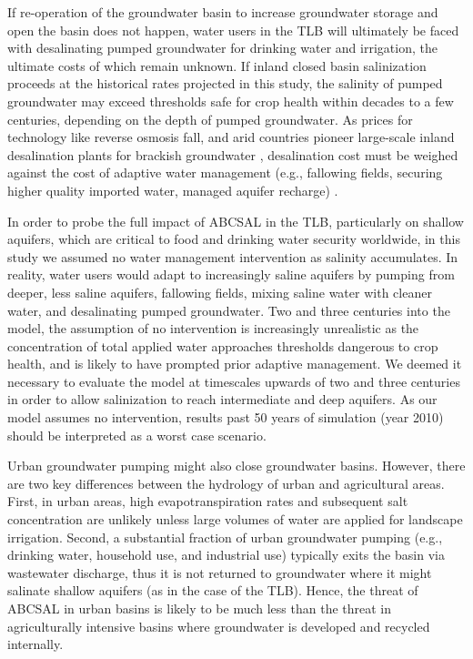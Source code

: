 If re-operation of the groundwater basin to increase groundwater storage and open the basin does not happen, water users in the TLB will ultimately be faced with desalinating pumped groundwater for drinking water and irrigation, the ultimate costs of which remain unknown. If inland closed basin salinization proceeds at the historical rates projected in this study, the salinity of pumped groundwater may exceed thresholds safe for crop health within decades to a few centuries, depending on the depth of pumped groundwater. As prices for technology like reverse osmosis fall, and arid countries pioneer large-scale inland desalination plants for brackish groundwater \citep{Nativ2004, Tal2006}, desalination cost must be weighed against the cost of adaptive water management (e.g., fallowing fields, securing higher quality imported water, managed aquifer recharge) \citep{Hanak2019}. %

In order to probe the full impact of ABCSAL in the TLB, particularly on shallow aquifers, which are critical to food and drinking water security worldwide, in this study we assumed no water management intervention as salinity accumulates. In reality, water users would adapt to increasingly saline aquifers by pumping from deeper, less saline aquifers, fallowing fields, mixing saline water with cleaner water, and desalinating pumped groundwater. Two and three centuries into the model, the assumption of no intervention is increasingly unrealistic as the concentration of total applied water approaches thresholds dangerous to crop health, and is likely to have prompted prior adaptive management. We deemed it necessary to evaluate the model at timescales upwards of two and three centuries in order to allow salinization to reach intermediate and deep aquifers. As our model assumes no intervention, results past 50 years of simulation (year 2010) should be interpreted as a worst case scenario.

Urban groundwater pumping might also close groundwater basins. However, there are two key differences between the hydrology of urban and agricultural areas. First, in urban areas, high evapotranspiration rates and subsequent salt concentration are unlikely unless large volumes of water are applied for landscape irrigation. Second, a substantial fraction of urban groundwater pumping (e.g., drinking water, household use, and industrial use) typically exits the basin via wastewater discharge, thus it is not returned to groundwater where it might salinate shallow aquifers (as in the case of the TLB). Hence, the threat of ABCSAL in urban basins is likely to be much less than the threat in agriculturally intensive basins where groundwater is developed and recycled internally.  


